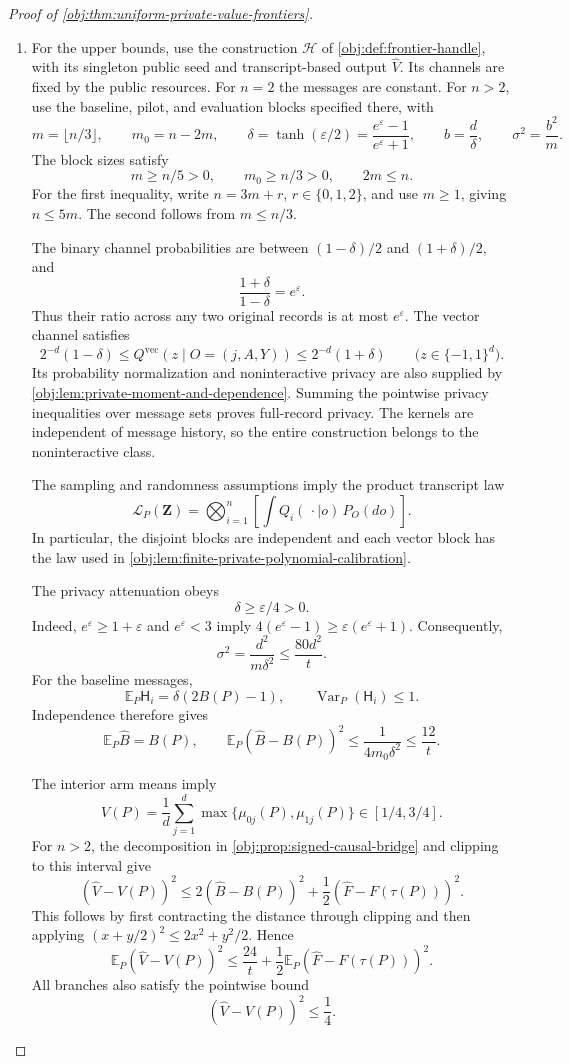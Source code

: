 \begin{proof}[Proof of \cref{obj:thm:uniform-private-value-frontiers}]
\begin{enumerate}
\item
For the upper bounds, use the construction \(\mathscr H\) of
\cref{obj:def:frontier-handle}, with its singleton public seed and transcript-based output \(\widehat V\). Its channels are fixed by the public resources. For \(n=2\) the messages are constant. For \(n>2\), use the baseline, pilot, and evaluation blocks specified there, with
\[
m=\lfloor n/3\rfloor,\qquad m_0=n-2m,\qquad
\delta=\tanh(\varepsilon/2)=\frac{e^\varepsilon-1}{e^\varepsilon+1},
\qquad b=\frac d\delta,\qquad \sigma^2=\frac{b^2}{m}.
\]
The block sizes satisfy
\[
m\ge n/5>0,\qquad m_0\ge n/3>0,\qquad 2m\le n.
\]
For the first inequality, write \(n=3m+r\), \(r\in\{0,1,2\}\), and use \(m\ge1\), giving \(n\le5m\). The second follows from \(m\le n/3\).

The binary channel probabilities are between \((1-\delta)/2\) and
\((1+\delta)/2\), and
\[
\frac{1+\delta}{1-\delta}=e^\varepsilon.
\]
Thus their ratio across any two original records is at most
\(e^\varepsilon\). The vector channel satisfies
\[
2^{-d}(1-\delta)
\le Q^{\mathrm{vec}}(z\mid O=(j,A,Y))
\le 2^{-d}(1+\delta)
\qquad\bigl(z\in\{-1,1\}^d\bigr).
\]
Its probability normalization and noninteractive privacy are also supplied by
\cref{obj:lem:private-moment-and-dependence}. Summing the pointwise privacy inequalities over message sets proves full-record privacy. The kernels are independent of message history, so the entire construction belongs to the noninteractive class.

The sampling and randomness assumptions imply the product transcript law
\[
\mathcal L_P(\mathbf Z)
=\bigotimes_{i=1}^n
\left[\int Q_i(\,\cdot\mid o)\,P_O(do)\right].
\]
In particular, the disjoint blocks are independent and each vector block has the law used in \cref{obj:lem:finite-private-polynomial-calibration}.

The privacy attenuation obeys
\[
\delta\ge\varepsilon/4>0.
\]
Indeed, \(e^\varepsilon\ge1+\varepsilon\) and \(e^\varepsilon<3\) imply
\(4(e^\varepsilon-1)\ge\varepsilon(e^\varepsilon+1)\).
Consequently,
\[
\sigma^2=\frac{d^2}{m\delta^2}\le\frac{80d^2}{t}.
\]
For the baseline messages,
\[
\mathbb E_P\mathsf H_i=\delta(2B(P)-1),
\qquad
\operatorname{Var}_P(\mathsf H_i)\le1.
\]
Independence therefore gives
\[
\mathbb E_P\widehat B=B(P),
\qquad
\mathbb E_P(\widehat B-B(P))^2
\le\frac1{4m_0\delta^2}\le\frac{12}{t}.
\]

The interior arm means imply
\[
V(P)=\frac1d\sum_{j=1}^d
       \max\{\mu_{0j}(P),\mu_{1j}(P)\}\in[1/4,3/4].
\]
For \(n>2\), the decomposition in \cref{obj:prop:signed-causal-bridge} and clipping to this interval give
\[
(\widehat V-V(P))^2
\le2(\widehat B-B(P))^2
   +\frac12(\widehat F-F(\tau(P)))^2.
\]
This follows by first contracting the distance through clipping and then applying
\((x+y/2)^2\le2x^2+y^2/2\).
Hence
\[
\mathbb E_P(\widehat V-V(P))^2
\le\frac{24}{t}
+\frac12\mathbb E_P(\widehat F-F(\tau(P)))^2.
\]
All branches also satisfy the pointwise bound
\[
(\widehat V-V(P))^2\le\frac14.
\]


\end{enumerate}
\end{proof}
